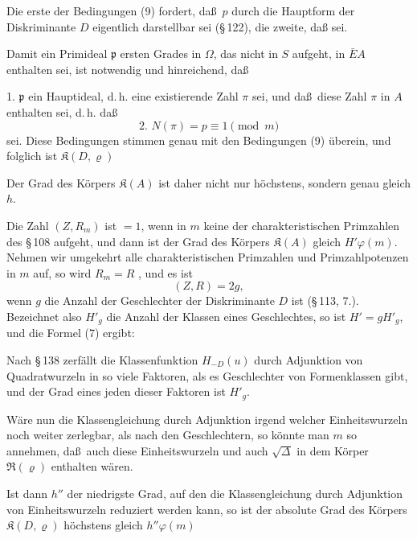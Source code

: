 
Die erste der Bedingungen (9) fordert, da\ss\ $p$ durch die Hauptform der Diskriminante $D$ eigentlich darstellbar sei (\S\,122), die zweite, da\ss
{}
sei.

Damit ein Primideal $\mathfrak{p}$ ersten Grades in $\Omega$, das nicht in $S$ aufgeht, in $\bar{E}A$ enthalten sei, ist notwendig und hinreichend, da\ss

1. $\mathfrak{p}$ ein Hauptideal, d.\,h. eine existierende Zahl $\pi$ sei, und da\ss\ diese Zahl $\pi$ in $A$ enthalten sei, d.\,h. da\ss
\[
\text{2. } N(\pi) = p \equiv 1 \pmod{m}
\]
sei. Diese Bedingungen stimmen genau mit den Bedingungen (9) \"uberein, und folglich ist $\mathfrak{K}(D, \varrho)$ 

Der Grad des K\"orpers $\mathfrak{K}(A)$ ist daher nicht nur h\"ochstens, sondern genau gleich $h$.

Die Zahl $(Z, R_m)$ ist $=1$, wenn in $m$ keine der charakteristischen Primzahlen des \S\,108 aufgeht, und dann ist der Grad des K\"orpers $\mathfrak{K}(A)$ gleich $H'\varphi(m)$. Nehmen wir umgekehrt alle charakteristischen Primzahlen und Primzahlpotenzen in $m$ auf, so wird $R_m = R$ , und es ist
\[
(Z, R) = 2g,
\]
wenn $g$ die Anzahl der Geschlechter der Diskriminante $D$ ist (\S\,113, 7.). Bezeichnet also $H'_g$ die Anzahl der Klassen eines Geschlechtes, so ist $H' = g H'_g$, und die Formel (7) ergibt:

Nach \S\,138 zerf\"allt die Klassenfunktion $H_{-D}(u)$ durch Adjunktion von Quadratwurzeln in so viele Faktoren, als es Geschlechter von Formenklassen gibt, und der Grad eines jeden dieser Faktoren ist $H'_g$.

W\"are nun die Klassengleichung durch Adjunktion irgend welcher Einheitswurzeln noch weiter zerlegbar, als nach den Geschlechtern, so k\"onnte man $m$ so annehmen, da\ss\ auch diese Einheitswurzeln und auch $\sqrt{\Delta}$ in dem K\"orper $\mathfrak{R}(\varrho)$ enthalten w\"aren.

Ist dann $h''$ der niedrigste Grad, auf den die Klassengleichung durch Adjunktion von Einheitswurzeln reduziert werden kann, so ist der absolute Grad des K\"orpers $\mathfrak{K}(D, \varrho)$ h\"ochstens gleich $h''\varphi(m)$
